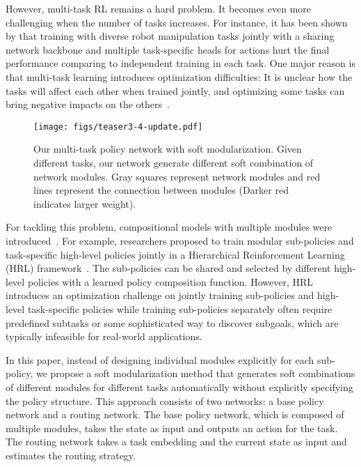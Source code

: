 \documentclass{article}
\begin{document}
However, multi-task RL remains a hard problem. It becomes even more challenging when the number of tasks increases. For instance, it has been shown by \cite{yu2019meta} that training with diverse robot manipulation tasks jointly with a sharing network backbone and multiple task-specific heads for actions hurt the final performance comparing to independent training in each task. One major reason is that multi-task learning introduces optimization difficulties: It is unclear how the tasks will affect each other when trained jointly, and optimizing some tasks can bring negative impacts on the others~\cite{teh2017distral}. 

\begin{figure}[t]
\centering
\texttt{[image: figs/teaser3-4-update.pdf]}
\vspace{-0.2in}
\caption{\small{Our multi-task policy network with soft modularization. Given different tasks, our network generate different soft combination of network modules. Gray squares represent network modules and red lines represent the connection between modules (Darker red indicates larger weight).}}
\label{fig:teaser}
\vspace{-0.27in}
\end{figure}

For tackling this problem,  compositional models with multiple modules were introduced~\cite{andreas2017modular,haarnoja2018composable}. For example, researchers proposed to train modular sub-policies and task-specific high-level policies jointly in a Hierarchical Reinforcement Learning (HRL) framework~\cite{andreas2017modular}. The sub-policies can be shared and selected by different high-level policies with a learned policy composition function. 
However, HRL introduces an optimization challenge on jointly training sub-policies and high-level task-specific policies while training sub-policies separately often require predefined subtasks or some sophisticated way to discover subgoals, which are typically infeasible for real-world applications. 


In this paper, instead of designing individual modules explicitly for each sub-policy, we propose a soft modularization method that generates soft combinations of different modules for different tasks automatically without explicitly specifying the policy structure. This approach consists of two networks: a base policy network and a routing network. The base policy network, which is composed of multiple modules, takes the state as input and outputs an action for the task.  The routing network takes a task embedding and the current state as input and estimates the routing strategy. 
\end{document}
